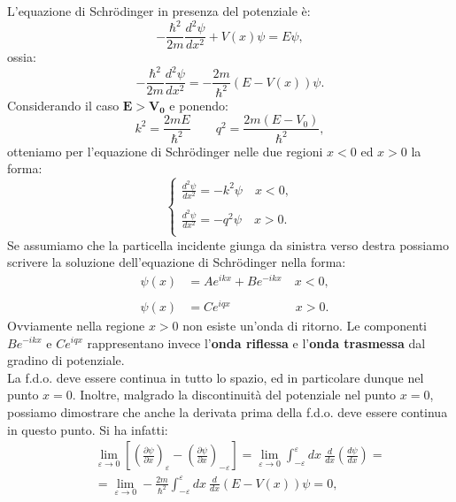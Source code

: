 L'equazione di Schr\"{o}dinger in presenza del potenziale è:
\begin{equation}
-\frac{\hbar ^2}{2m}\frac{d^2 \psi}{dx^2}+ V(x)\psi= E\psi, 
\end{equation}
ossia:
\begin{equation}
-\frac{\hbar ^2}{2m}\frac{d^2 \psi}{dx^2}= -\frac{2m}{\hbar ^2}\left( E-V(x)\right) \psi. 
\end{equation}
Considerando il caso $\mathbf{E>V_0}$ e ponendo:
\begin{equation}
k^2=\frac{2mE}{\hbar ^2} \qquad q^2=\frac{2m\left( E- V_0\right)}{\hbar ^2},
\end{equation}
otteniamo per l'equazione di Schr\"{o}dinger nelle due regioni $x<0$ ed $x>0$ la forma:
\begin{equation}
\begin{cases}
\displaystyle{\frac{d^2 \psi}{dx^2}= -k^2 \psi \quad x<0,}\\
\\
\displaystyle{\frac{d^2 \psi}{dx^2}= -q^2 \psi \quad x>0.}\\
\end{cases}
\end{equation}
Se assumiamo che la particella incidente giunga da sinistra verso destra possiamo scrivere la soluzione dell'equazione di Schr\"{o}dinger nella forma:
\begin{eqnarray}
&\psi(x)& = Ae^{ikx}+Be^{-ikx} \quad x<0,\nonumber\\
\\
&\psi(x)& = Ce^{iqx} \qquad \ \quad \qquad x>0.\nonumber
\end{eqnarray}
Ovviamente nella regione $x>0$ non esiste un'onda di ritorno. Le componenti $\displaystyle{Be^{-ikx}}$ e $\displaystyle{Ce^{iqx}}$ rappresentano invece l'\textbf{onda riflessa} e l'\textbf{onda trasmessa} dal gradino di potenziale.\\
La f.d.o. deve essere continua in tutto lo spazio, ed in particolare dunque nel punto $x=0$. Inoltre, malgrado la discontinuità del potenziale nel punto $x=0$, possiamo dimostrare che anche la derivata prima della f.d.o. deve essere continua in questo punto. Si ha infatti:
\begin{eqnarray}
& &\lim _{\varepsilon \rightarrow 0 } \left[ \left( \frac{\partial \psi}{\partial x}\right) _{\varepsilon}-\left( \frac{\partial \psi}{\partial x}\right)_{-\varepsilon}\right]=\lim _{\varepsilon \rightarrow 0 } \int_{-\varepsilon} ^{\varepsilon} dx\ \frac{d}{dx} \left( \frac{d\psi}{dx}\right)= \nonumber \\
& & = \lim _{\varepsilon \rightarrow 0 } -\frac{2m}{\hbar ^2}\int_{-\varepsilon} ^{\varepsilon} dx\ \frac{d}{dx} \left(E-V(x) \right)\psi=0,
\end{eqnarray}
